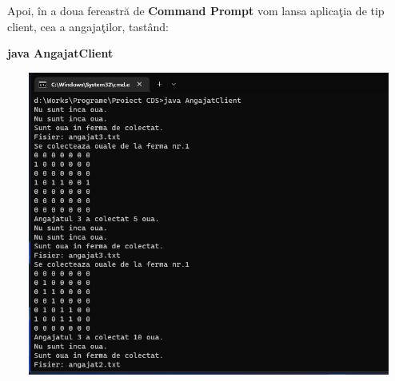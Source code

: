 \documentclass[12pt,a4paper]{article}
\begin{document}
	Apoi, \^{i}n a doua fereastr\u{a} de \textbf{Command Prompt} vom lansa aplica\c{t}ia de tip client, cea a angaja\c{t}ilor, tast\^{a}nd: 
	\newline \begin{center} \textbf{java AngajatClient}\end{center}
	\includegraphics[width=15cm, height=10cm]{AngajatClient.png} 
\end{document}
